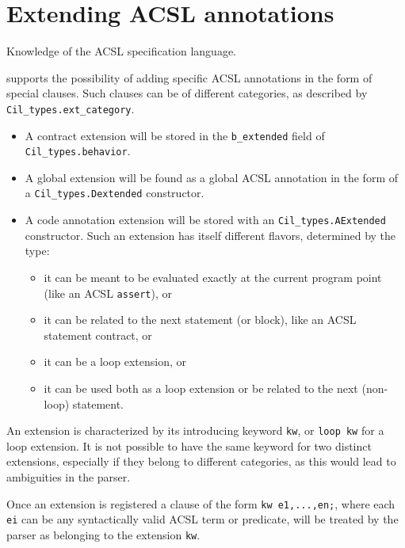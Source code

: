 
\section{Extending ACSL annotations}\label{sec:extend-acsl-annot}
\begin{prereq}
  Knowledge of the ACSL specification language.
\end{prereq}

\framac supports the possibility of adding specific ACSL annotations in the
form of special clauses.
Such clauses can be of different categories, as described by
\texttt{Cil\_types.ext\_category}.
\begin{itemize}
\item A contract extension will be
stored in the \texttt{b\_extended} field of
\texttt{Cil\_types.behavior}.
\item A global extension will be found as a global ACSL annotation in the form of a
\texttt{Cil\_types.Dextended} constructor.
\item A code annotation extension will be stored with an
\texttt{Cil\_types.AExtended} constructor. Such an extension has itself
different flavors, determined by the  type:
\begin{itemize}
\item it can be meant to be evaluated exactly at the current program point
 (like an ACSL \texttt{assert}), or
\item it can be related to the next statement (or block), like an ACSL statement contract, or
\item it can be a loop extension, or
\item it can be used both as a loop extension or be related to the next (non-loop) statement.
\end{itemize}
\end{itemize}

An extension is characterized by its introducing keyword \texttt{kw}, or \texttt{loop kw} for a loop
extension. It is not possible to have the same keyword for two distinct extensions, especially if
they belong to different categories, as this would lead to ambiguities in the parser.

Once an extension is registered a clause of the form \verb|kw e1,...,en;|, where each \verb|ei| can be
any syntactically valid ACSL term or predicate, will be treated by the parser as belonging to the
extension \verb|kw|.

